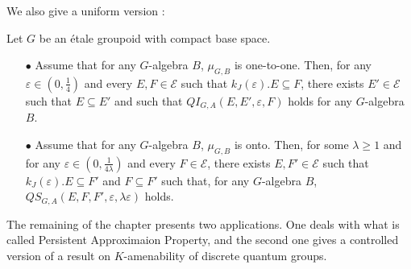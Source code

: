 We also give a uniform version :
\begin{thm} Let $G$ be an étale groupoid with compact base space. 
\begin{itemize}
\item[$\bullet$] Assume that for any $G$-algebra $B$, $\mu_{G,B}$ is one-to-one. Then, for any $\varepsilon\in (0,\frac{1}{4})$ and every $E,F\in\mathcal E$ such that $k_J(\varepsilon). E\subseteq F$, there exists $E'\in\mathcal E$ such that $E\subseteq E'$ and such that $QI_{G,A}(E,E',\varepsilon,F)$ holds for any $G$-algebra $B$.
\item[$\bullet$] Assume that for any $G$-algebra $B$, $\mu_{G,B}$ is onto. Then, for some $\lambda \geq 1$ and for any $\varepsilon\in (0,\frac{1}{4\lambda})$ and every $F\in\mathcal E$, there exists $E,F'\in\mathcal E$ such that $k_J(\varepsilon). E\subseteq F'$ and $F\subseteq F'$ such that, for any $G$-algebra $B$, $QS_{G,A}(E, F,F',\varepsilon,\lambda \varepsilon)$ holds.
\end{itemize}
\end{thm}

The remaining of the chapter  presents two applications. One deals with what is called Persistent Approximaion Property, and the second one gives a controlled version of a result on $K$-amenability of discrete quantum groups. \\

